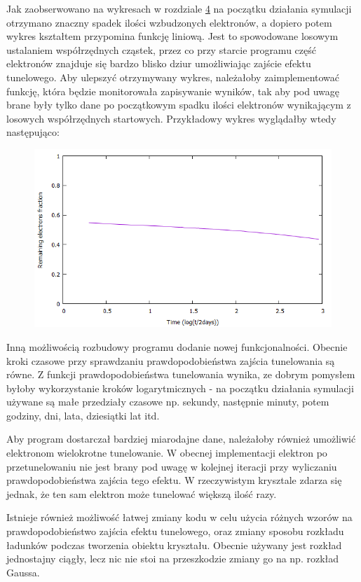 Jak zaobserwowano na wykresach w rozdziale \hyperref[wynik:wykres]{4} na początku działania symulacji otrzymano znaczny spadek ilości wzbudzonych elektronów, a dopiero potem wykres kształtem przypomina funkcję liniową. Jest to spowodowane losowym ustalaniem współrzędnych cząstek, przez co przy starcie programu część elektronów znajduje się bardzo blisko dziur umożliwiając zajście efektu tunelowego. Aby ulepszyć otrzymywany wykres, należałoby zaimplementować funkcję, która będzie monitorowała zapisywanie wyników, tak aby pod uwagę brane były tylko dane po początkowym spadku ilości elektronów wynikającym z losowych współrzędnych startowych. Przykładowy wykres wyglądałby wtedy następująco:
\begin{figure}[h]
\centering
\includegraphics[width=17cm]{przyklad_ulepszony}
\end{figure}

Inną możliwością rozbudowy programu dodanie nowej funkcjonalności. Obecnie kroki czasowe przy sprawdzaniu prawdopodobieństwa zajścia tunelowania są równe. Z funkcji prawdopodobieństwa tunelowania wynika, ze dobrym pomysłem byłoby wykorzystanie kroków logarytmicznych - na początku działania symulacji używane są małe przedziały czasowe np. sekundy, następnie minuty, potem godziny, dni, lata, dziesiątki lat itd.

Aby program dostarczał bardziej miarodajne dane, należałoby również umożliwić elektronom wielokrotne tunelowanie. W obecnej implementacji elektron po przetunelowaniu nie jest brany pod uwagę w kolejnej iteracji przy wyliczaniu prawdopodobieństwa zajścia tego efektu. W rzeczywistym krysztale zdarza się jednak, że ten sam elektron może tunelować większą ilość razy.

Istnieje również możliwość łatwej zmiany kodu w celu użycia różnych wzorów na prawdopodobieństwo zajścia efektu tunelowego, oraz zmiany sposobu rozkładu ładunków podczas tworzenia obiektu kryształu. Obecnie używany jest rozkład jednostajny ciągły, lecz nic nie stoi na przeszkodzie zmiany go na np. rozkład Gaussa. 